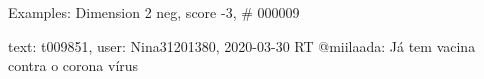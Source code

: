 \begin{frame}{Examples: Dimension 2 neg, score -3, \# 000009}
\footnotesize
\begin{alertblock}{text: t009851, user: Nina31201380, 2020-03-30}
RT @miilaada: Já tem vacina contra o corona vírus 
  
\end{alertblock}
\end{frame}

